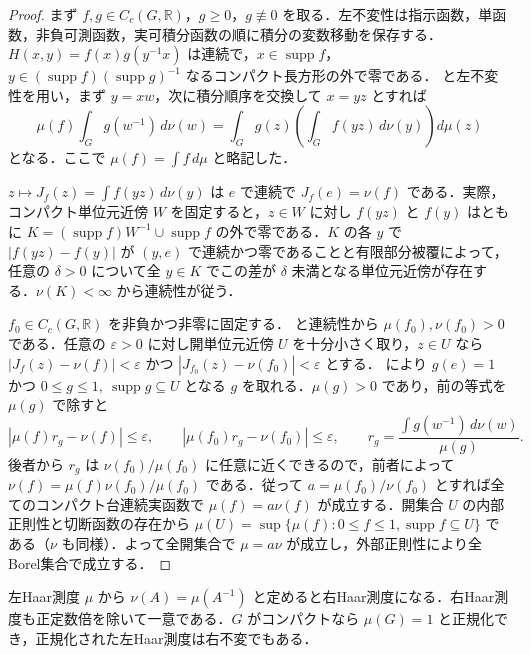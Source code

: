 \begin{proof}
まず $f,g\in C_c(G,\mathbb R)$，$g\geq0$，$g\not\equiv0$ を取る．左不変性は指示函数，単函数，非負可測函数，実可積分函数の順に積分の変数移動を保存する．$H(x,y)=f(x)g(y^{-1}x)$ は連続で，$x\in\operatorname{supp}f$，$y\in(\operatorname{supp}f)(\operatorname{supp}g)^{-1}$ なるコンパクト長方形の外で零である． と左不変性を用い，まず $y=xw$，次に積分順序を交換して $x=yz$ とすれば
\[
\mu(f)\int_G g(w^{-1})\,d\nu(w)
=\int_G g(z)\left(\int_G f(yz)\,d\nu(y)\right)d\mu(z)
\]
となる．ここで $\mu(f)=\int f\,d\mu$ と略記した．

$z\mapsto J_f(z)=\int f(yz)\,d\nu(y)$ は $e$ で連続で $J_f(e)=\nu(f)$ である．実際，コンパクト単位元近傍 $W$ を固定すると，$z\in W$ に対し $f(yz)$ と $f(y)$ はともに $K=(\operatorname{supp}f)W^{-1}\cup\operatorname{supp}f$ の外で零である．$K$ の各 $y$ で $|f(yz)-f(y)|$ が $(y,e)$ で連続かつ零であることと有限部分被覆によって，任意の $\delta>0$ について全 $y\in K$ でこの差が $\delta$ 未満となる単位元近傍が存在する．$\nu(K)<\infty$ から連続性が従う．

$f_0\in C_c(G,\mathbb R)$ を非負かつ非零に固定する． と連続性から $\mu(f_0),\nu(f_0)>0$ である．任意の $\varepsilon>0$ に対し開単位元近傍 $U$ を十分小さく取り，$z\in U$ なら $|J_f(z)-\nu(f)|<\varepsilon$ かつ $|J_{f_0}(z)-\nu(f_0)|<\varepsilon$ とする． により $g(e)=1$ かつ $0\leq g\leq1,\ \operatorname{supp}g\subseteq U$ となる $g$ を取れる．$\mu(g)>0$ であり，前の等式を $\mu(g)$ で除すと
\[
|\mu(f)r_g-\nu(f)|\leq\varepsilon,\qquad
|\mu(f_0)r_g-\nu(f_0)|\leq\varepsilon,\qquad
r_g=\frac{\int g(w^{-1})\,d\nu(w)}{\mu(g)} .
\]
後者から $r_g$ は $\nu(f_0)/\mu(f_0)$ に任意に近くできるので，前者によって $\nu(f)=\mu(f)\nu(f_0)/\mu(f_0)$ である．従って $a=\mu(f_0)/\nu(f_0)$ とすれば全てのコンパクト台連続実函数で $\mu(f)=a\nu(f)$ が成立する．開集合 $U$ の内部正則性と切断函数の存在から $\mu(U)=\sup\{\mu(f):0\leq f\leq1,\operatorname{supp}f\subseteq U\}$ である（$\nu$ も同様）．よって全開集合で $\mu=a\nu$ が成立し，外部正則性により全Borel集合で成立する．
\end{proof}
\begin{prop}[右Haar測度とコンパクト群の正規化]
左Haar測度 $\mu$ から $\nu(A)=\mu(A^{-1})$ と定めると右Haar測度になる．右Haar測度も正定数倍を除いて一意である．$G$ がコンパクトなら $\mu(G)=1$ と正規化でき，正規化された左Haar測度は右不変でもある．
\end{prop}
